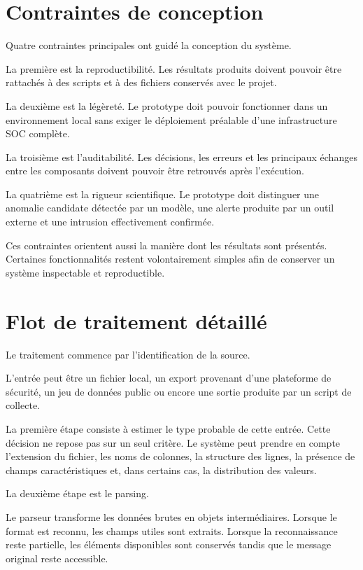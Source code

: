 \section{Contraintes de conception}

Quatre contraintes principales ont guidé la conception du système.

La première est la reproductibilité. Les résultats produits doivent pouvoir être rattachés à des scripts et à des fichiers conservés avec le projet.

La deuxième est la légèreté. Le prototype doit pouvoir fonctionner dans un environnement local sans exiger le déploiement préalable d'une infrastructure SOC complète.

La troisième est l'auditabilité. Les décisions, les erreurs et les principaux échanges entre les composants doivent pouvoir être retrouvés après l'exécution.

La quatrième est la rigueur scientifique. Le prototype doit distinguer une anomalie candidate détectée par un modèle, une alerte produite par un outil externe et une intrusion effectivement confirmée.

Ces contraintes orientent aussi la manière dont les résultats sont présentés. Certaines fonctionnalités restent volontairement simples afin de conserver un système inspectable et reproductible.

\section{Flot de traitement détaillé}

Le traitement commence par l'identification de la source.

L'entrée peut être un fichier local, un export provenant d'une plateforme de sécurité, un jeu de données public ou encore une sortie produite par un script de collecte.

La première étape consiste à estimer le type probable de cette entrée. Cette décision ne repose pas sur un seul critère. Le système peut prendre en compte l'extension du fichier, les noms de colonnes, la structure des lignes, la présence de champs caractéristiques et, dans certains cas, la distribution des valeurs.

La deuxième étape est le parsing.

Le parseur transforme les données brutes en objets intermédiaires. Lorsque le format est reconnu, les champs utiles sont extraits. Lorsque la reconnaissance reste partielle, les éléments disponibles sont conservés tandis que le message original reste accessible.

